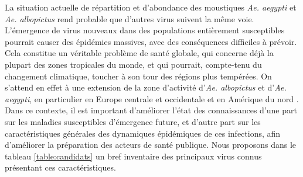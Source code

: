 La situation actuelle de répartition et d'abondance des moustiques {\em Ae. aegypti} et {\em Ae. albopictus} rend probable que d'autres virus suivent la même voie.
L'émergence de virus nouveaux dans des populations entièrement susceptibles pourrait causer des épidémies massives, avec des conséquences difficiles à prévoir.
Cela constitue un véritable problème de santé globale, qui concerne déjà la plupart des zones tropicales du monde, et qui pourrait, compte-tenu du changement climatique, toucher à son tour des régions plus tempérées. 
On s'attend en effet à une extension de la zone d'activité d'{\em Ae. albopictus} et d'{\em Ae. aegypti}, en particulier en Europe centrale et occidentale et en Amérique du nord \cite{fischer2011projection,rochlin2013climate,monaghan2018potential}.
Dans ce contexte, il est important d'améliorer l'état des connaissances d'une part sur les maladies susceptibles d'émergence future, et d'autre part sur les caractéristiques générales des dynamiques épidémiques de ces infections, afin d'améliorer la préparation des acteurs de santé publique.
Nous proposons dans le tableau \ref{table:candidats} un bref inventaire des principaux virus connus présentant ces caractéristiques.


%
%
%

